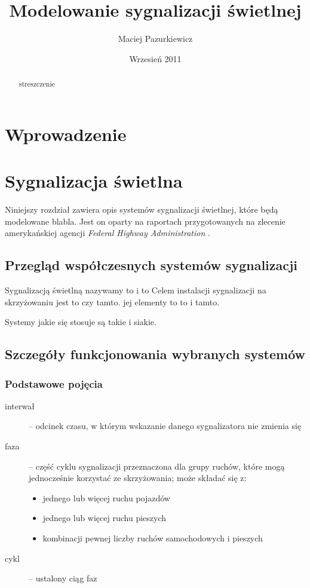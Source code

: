 \documentclass{pracamgr}
\author{Maciej Pazurkiewicz}
\title{Modelowanie sygnalizacji świetlnej}
\date{Wrzesień 2011}
\begin{document}
\maketitle

\begin{abstract}
streszczenie
\end{abstract}

\tableofcontents

\chapter*{Wprowadzenie}

\chapter{Sygnalizacja świetlna}
\label{c:sygnalizacja}

Niniejszy rozdział zawiera opis systemów sygnalizacji świetlnej, które
będą modelowane blabla. Jest on oparty na raportach przygotowanych na
zlecenie amerykańskiej agencji \emph{Federal Highway Administration}
\cite{timing} \cite{handbook}.

\section{Przegląd współczesnych systemów sygnalizacji}
\label{s:przeglad}

Sygnalizacją świetlną nazywamy to i to
Celem instalacji sygnalizacji na skrzyżowaniu jest to czy tamto.
 jej elementy to to i tamto.

 Systemy jakie się stosuje są takie i siakie.


\section{Szczegóły funkcjonowania wybranych systemów}
\label{s:szczegoly}

\subsection{Podstawowe pojęcia}
\label{ss:pojecia}

\begin{description}
  \item[interwał] -- odcinek czasu, w którym wskazanie danego
  sygnalizatora nie zmienia się
  \item[faza] -- część cyklu sygnalizacji przeznaczona dla grupy
  ruchów, które mogą jednocześnie korzystać ze skrzyżowania; może
  składać się z:
  \begin{itemize}
    \item jednego lub więcej ruchu pojazdów
    \item jednego lub więcej ruchu pieszych
    \item kombinacji pewnej liczby ruchów samochodowych i pieszych
  \end{itemize}
  \item[cykl] -- ustalony ciąg faz

  
\end{description}
\end{document}
